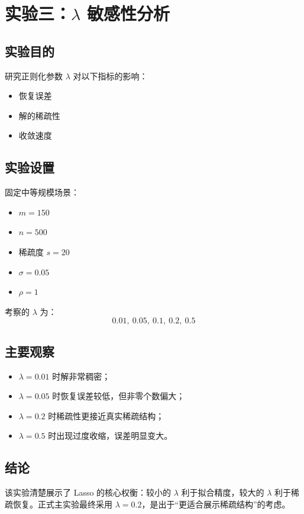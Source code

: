 \documentclass[12pt,a4paper]{ctexart}
\begin{document}
\section{实验三：$\lambda$ 敏感性分析}
\subsection{实验目的}
研究正则化参数 $\lambda$ 对以下指标的影响：
\begin{itemize}[leftmargin=2em]
    \item 恢复误差
    \item 解的稀疏性
    \item 收敛速度
\end{itemize}

\subsection{实验设置}
固定中等规模场景：
\begin{itemize}[leftmargin=2em]
    \item $m=150$
    \item $n=500$
    \item 稀疏度 $s=20$
    \item $\sigma=0.05$
    \item $\rho=1$
\end{itemize}
考察的 $\lambda$ 为：
\[
0.01,\ 0.05,\ 0.1,\ 0.2,\ 0.5
\]

\subsection{主要观察}
\begin{itemize}[leftmargin=2em]
    \item $\lambda=0.01$ 时解非常稠密；
    \item $\lambda=0.05$ 时恢复误差较低，但非零个数偏大；
    \item $\lambda=0.2$ 时稀疏性更接近真实稀疏结构；
    \item $\lambda=0.5$ 时出现过度收缩，误差明显变大。
\end{itemize}

\subsection{结论}
该实验清楚展示了 Lasso 的核心权衡：较小的 $\lambda$ 利于拟合精度，较大的 $\lambda$ 利于稀疏恢复。正式主实验最终采用 $\lambda=0.2$，是出于“更适合展示稀疏结构”的考虑。
\end{document}
